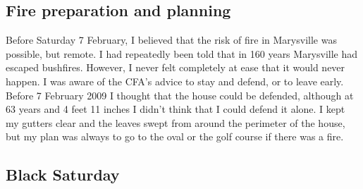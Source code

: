 \documentclass[a4paper]{article}
\begin{document}
    \subsection{Fire preparation and planning}

    Before Saturday 7 February, I believed that the risk of fire in Marysville was possible, but remote. I had repeatedly been told that in 160 years Marysville had escaped bushfires. However, I never felt completely at ease that it would never happen.
    I was aware of the CFA's advice to stay and defend, or to leave early. Before 7 February 2009 I thought that the house could be defended, although at 63 years and 4 feet 11 inches I didn't think that I could defend it alone. I kept my gutters clear and the leaves swept from around the perimeter of the house, but my plan was always to go to the oval or the golf course if there was a fire.

    \subsection{Black Saturday}
\end{document}

